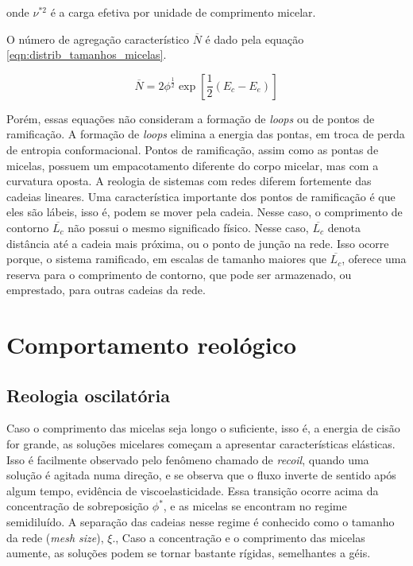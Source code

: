 		\noindent onde \(\nu^{*2}\) é a carga efetiva por unidade de comprimento micelar.
		 
		O número de agregação característico \(\overline{N}\) é dado pela equação \ref{eqn:distrib_tamanhos_micelas}.
		
		\begin{equation}
			\overline{N} = 2 \phi ^{\frac{1}{2}} \exp \left[ \frac{1}{2} \left( E_c - E_e \right) \right]
			\label{eqn:distrib_tamanhos_micelas}
		\end{equation} %
		 
		Porém, essas equações não consideram a formação de \emph{loops} ou de pontos de ramificação. A formação de \emph{loops} elimina a energia das pontas, em troca de perda de entropia conformacional. Pontos de ramificação, assim como as pontas de micelas, possuem um empacotamento diferente do corpo micelar, mas com a curvatura oposta. %
		A reologia de sistemas com redes diferem fortemente das cadeias lineares. %
		Uma característica importante dos pontos de ramificação é que eles são lábeis, isso é, podem se mover pela cadeia. Nesse caso, o comprimento de contorno \(\overline{L_c}\) não possui o mesmo significado físico. Nesse caso, \(\overline{L_c}\) denota distância até a cadeia mais próxima, ou o ponto de junção na rede. Isso ocorre porque, o sistema ramificado, em escalas de tamanho maiores que \(\overline{L_c}\), oferece uma reserva para o comprimento de contorno, que pode ser armazenado, ou emprestado, para outras cadeias da rede. %
		
		\section{Comportamento reológico}
		
		\subsection{Reologia oscilatória}
		
		Caso o comprimento das micelas seja longo o suficiente, isso é, a energia de cisão for grande, as soluções micelares começam a apresentar características elásticas. Isso é facilmente observado pelo fenômeno chamado de \emph{recoil}, quando uma solução é agitada numa direção, e se observa que o fluxo inverte de sentido após algum tempo, evidência de viscoelasticidade. Essa transição ocorre acima da concentração de sobreposição \(\phi^*\), e as micelas se encontram no regime semidiluído. A separação das cadeias nesse regime é conhecido como o tamanho da rede (\emph{mesh size}), \(\xi\)., %
		Caso a concentração e o comprimento das micelas aumente, as soluções podem se tornar bastante rígidas, semelhantes a géis.
		
